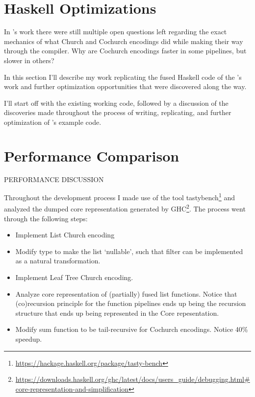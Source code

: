 
\section{Haskell Optimizations}\label{sec:haskell}
In \cite{Harper2011}'s work there were still multiple open questions left regarding the exact mechanics of what Church and Cochurch encodings did while making their way through the compiler. Why are Cochurch encodings faster in some pipelines, but slower in others?

In this section I'll describe my work replicating the fused Haskell code of the \cite{Harper2011}'s work and further optimization opportunities that were discovered along the way.

I'll start off with the existing working code, followed by a discussion of the discoveries made throughout the process of writing, replicating, and further optimization of \cite{Harper2011}'s example code.



\section{Performance Comparison}
PERFORMANCE DISCUSSION


Throughout the development process I made use of the tool tastybench\footnote{\url{https://hackage.haskell.org/package/tasty-bench}} and analyzed the dumped core representation generated by GHC\footnote{\url{https://downloads.haskell.org/ghc/latest/docs/users_guide/debugging.html\#core-representation-and-simplification}}.
The process went through the following steps:
\begin{itemize}
    \item Implement List Church encoding
    \item Modify type to make the list `nullable', such that filter can be implemented as a natural transformation.
    \item Implement Leaf Tree Church encoding.
    \item Analyze core representation of (partially) fused list functions. Notice that (co)recursion principle for the function pipelines ends up being the recursion structure that ends up being represented in the Core repesentation.
    \item Modify sum function to be tail-recursive for Cochurch encodings. Notice 40\% speedup.
\end{itemize}






